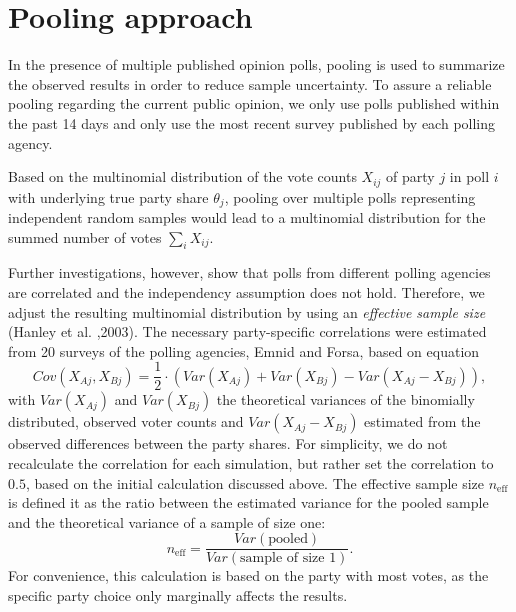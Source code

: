 \documentclass[twoside]{report}
\begin{document}
\section{Pooling approach}
In the presence of multiple published opinion polls, pooling is used to summarize the observed results in order to reduce sample uncertainty. To assure a reliable pooling regarding the current public opinion, we only use polls published within the past 14 days and only use the most recent survey published by each polling agency.

Based on the multinomial distribution of the vote counts $X_{ij}$ of party $j$ in poll $i$ with underlying true party share $\theta_j$, pooling over multiple polls representing independent random samples would lead to a multinomial distribution for the
summed number of votes $\sum_i X_{ij}$.

Further investigations, however, show that polls from different
polling agencies are correlated and the independency assumption
does not hold. Therefore, we adjust the resulting
multinomial distribution by using an \textit{effective sample size} (Hanley et al. ,2003). The necessary party-specific correlations were estimated from
20 surveys of the polling agencies, Emnid and Forsa, based on equation
$$
Cov(X_{Aj}, X_{Bj}) = \frac{1}{2} \cdot \left(Var(X_{Aj}) + Var(X_{Bj}) - Var(X_{Aj} - X_{Bj}) \right),
$$
with $Var(X_{Aj})$ and $Var(X_{Bj})$ the theoretical variances of the binomially distributed, observed voter counts and $Var(X_{Aj} - X_{Bj})$ estimated from the
observed differences between the party shares.  For simplicity, we do not
recalculate the correlation for each simulation, but rather set the correlation to
$0.5$, based on the initial calculation discussed above.
The effective sample size $n_{\text{eff}}$ is defined it as the ratio between
the estimated variance for the pooled sample and the theoretical variance of a
sample of size one:
$$
n_{\text{eff}} = \frac{Var(\text{pooled})}{Var(\text{sample of size 1})}.
$$
For convenience, this calculation is based on the party with most votes, as
the specific party choice only marginally affects the results.
\end{document}
